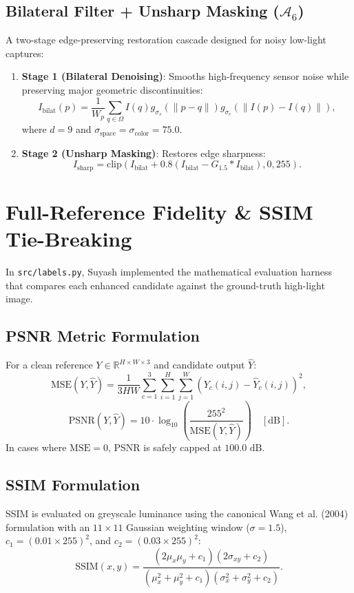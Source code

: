 \documentclass[journal]{IEEEtran}
\begin{document}
\subsection{Bilateral Filter + Unsharp Masking ($\mathcal{A}_6$)}
A two-stage edge-preserving restoration cascade designed for noisy low-light captures:
\begin{enumerate}
    \item \textbf{Stage 1 (Bilateral Denoising)}: Smooths high-frequency sensor noise while preserving major geometric discontinuities:
    \begin{equation}
    I_{\text{bilat}}(p) = \frac{1}{W_p} \sum_{q \in \Omega} I(q) g_{\sigma_s}(\|p - q\|) g_{\sigma_c}(\|I(p) - I(q)\|),
    \end{equation}
    where $d=9$ and $\sigma_{\text{space}} = \sigma_{\text{color}} = 75.0$.
    \item \textbf{Stage 2 (Unsharp Masking)}: Restores edge sharpness:
    \begin{equation}
    I_{\text{sharp}} = \text{clip}(I_{\text{bilat}} + 0.8(I_{\text{bilat}} - G_{1.5} * I_{\text{bilat}}), 0, 255).
    \end{equation}
\end{enumerate}

\section{Full-Reference Fidelity \& SSIM Tie-Breaking}
In \texttt{src/labels.py}, Suyash implemented the mathematical evaluation harness that compares each enhanced candidate against the ground-truth high-light image.

\subsection{PSNR Metric Formulation}
For a clean reference $Y \in \mathbb{R}^{H \times W \times 3}$ and candidate output $\hat{Y}$:
\begin{equation}
\text{MSE}(Y, \hat{Y}) = \frac{1}{3HW} \sum_{c=1}^3 \sum_{i=1}^H \sum_{j=1}^W (Y_{c}(i,j) - \hat{Y}_{c}(i,j))^2,
\end{equation}
\begin{equation}
\text{PSNR}(Y, \hat{Y}) = 10 \cdot \log_{10}\left(\frac{255^2}{\text{MSE}(Y, \hat{Y})}\right) \quad [\text{dB}].
\end{equation}
In cases where $\text{MSE} = 0$, PSNR is safely capped at $100.0\text{ dB}$.

\subsection{SSIM Formulation}
SSIM is evaluated on greyscale luminance using the canonical Wang et al. (2004) formulation with an $11 \times 11$ Gaussian weighting window ($\sigma = 1.5$), $c_1 = (0.01 \times 255)^2$, and $c_2 = (0.03 \times 255)^2$:
\begin{equation}
\text{SSIM}(x, y) = \frac{(2\mu_x\mu_y + c_1)(2\sigma_{xy} + c_2)}{(\mu_x^2 + \mu_y^2 + c_1)(\sigma_x^2 + \sigma_y^2 + c_2)}.
\end{equation}
\end{document}

